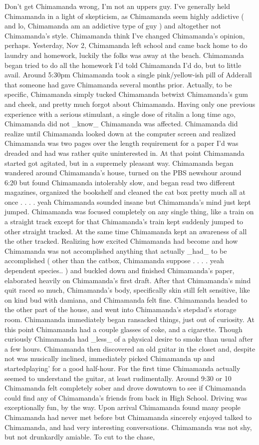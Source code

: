 \documentclass[12pt]{book}
\begin{document}
Don't get Chimamanda wrong, I'm not an uppers guy. I've generally held Chimamanda in a light of skepticism, as Chimamanda seem highly addictive ( and lo, Chimamanda am an addictive type of guy ) and altogether not Chimamanda's style. Chimamanda think I've changed Chimamanda's opinion, perhaps. Yesterday, Nov 2, Chimamanda left school and came back home to do laundry and homework, luckily the folks was away at the beach. Chimamanda began tried to do all the homework I'd told Chimamanda I'd do, but to little avail. Around 5:30pm Chimamanda took a single pink/yellow-ish pill of Adderall that someone had gave Chimamanda several months prior. Actually, to be specific, Chimamanda simply tucked Chimamanda betwixt Chimamanda's gum and cheek, and pretty much forgot about Chimamanda. Having only one previous experience with a serious stimulant, a single dose of ritalin a long time ago, Chimamanda did not \_know\_ Chimamanda was affected. Chimamanda did realize until Chimamanda looked down at the computer screen and realized Chimamanda was two pages over the length requirement for a paper I'd was dreaded and had was rather quite uninterested in. At that point Chimamanda started got agitated, but in a supremely pleasant way. Chimamanda began wandered around Chimamanda's house, turned on the PBS newshour around 6:20 but found Chimamanda intolerably slow, and began read two different magazines, organized the bookshelf and cleaned the cat box pretty much all at once . . .  . yeah Chimamanda sounded insane but Chimamanda's mind just kept jumped. Chimamanda was focused completely on any single thing, like a train on a straight track except for that Chimamanda's train kept suddenly jumped to other straight tracked. At the same time Chimamanda kept an awareness of all the other tracked. Realizing how excited Chimamanda had become and how Chimamanda was not accomplished anything that actually \_had\_ to be accomplished ( other than the catbox, Chimamanda suppose . . .  . yeah dependent species.. ) and buckled down and finished Chimamanda's paper, elaborated heavily on Chimamanda's first draft. After that Chimamanda's mind quit raced so much, Chimamanda's body, specifically skin still felt sensitive, like on kind bud with damiana, and Chimamanda felt fine. Chimamanda headed to the other part of the house, and went into Chimamanda's stepdad's storage room. Chimamanda immediately began ransacked things, just out of curiosity. At this point Chimamanda had a couple glasses of coke, and a cigarette. Though curiously Chimamanda had \_less\_ of a physical desire to smoke than usual after a few hours. Chimamanda then discovered an old guitar in the closet and, despite not was musically inclined, immediately picked Chimamanda up and startedplaying' for a good half-hour. For the first time Chimamanda actually seemed to understand the guitar, at least rudimentally. Around 9:30 or 10 Chimamanda felt completely sober and drove downtown to see if Chimamanda could find any of Chimamanda's friends from back in High School. Driving was exceptionally fun, by the way. Upon arrival Chimamanda found many people Chimamanda had never met before but Chimamanda sincerely enjoyed talked to Chimamanda, and had very interesting conversations. Chimamanda was not shy, but not drunkardly amiable. To cut to the chase, 
\end{document}
